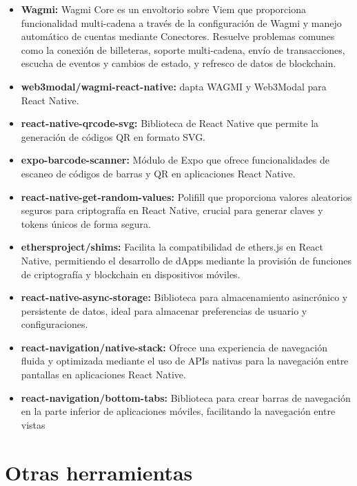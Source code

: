 \begin{itemize}
\item \textbf{Wagmi:} Wagmi Core es un envoltorio sobre Viem que proporciona funcionalidad multi-cadena a través de la configuración de Wagmi y manejo automático de cuentas mediante Conectores. Resuelve problemas comunes como la conexión de billeteras, soporte multi-cadena, envío de transacciones, escucha de eventos y cambios de estado, y refresco de datos de blockchain.

\item \textbf{web3modal/wagmi-react-native:} dapta WAGMI y Web3Modal para React Native.

\item \textbf{react-native-qrcode-svg:} Biblioteca de React Native que permite la generación de códigos QR en formato SVG.

\item \textbf{expo-barcode-scanner:} Módulo de Expo que ofrece funcionalidades de escaneo de códigos de barras y QR en aplicaciones React Native.

\item \textbf{react-native-get-random-values:} Polifill que proporciona valores aleatorios seguros para criptografía en React Native, crucial para generar claves y tokens únicos de forma segura.

\item \textbf{ethersproject/shims:} Facilita la compatibilidad de ethers.js en React Native, permitiendo el desarrollo de dApps mediante la provisión de funciones de criptografía y blockchain en dispositivos móviles.

\item \textbf{react-native-async-storage:} Biblioteca para almacenamiento asincrónico y persistente de datos, ideal para almacenar preferencias de usuario y configuraciones.

\item \textbf{react-navigation/native-stack:} Ofrece una experiencia de navegación fluida y optimizada mediante el uso de APIs nativas para la navegación entre pantallas en aplicaciones React Native.

\item \textbf{react-navigation/bottom-tabs:} Biblioteca para crear barras de navegación en la parte inferior de aplicaciones móviles, facilitando la navegación entre vistas

\end{itemize}


\section{Otras herramientas}

